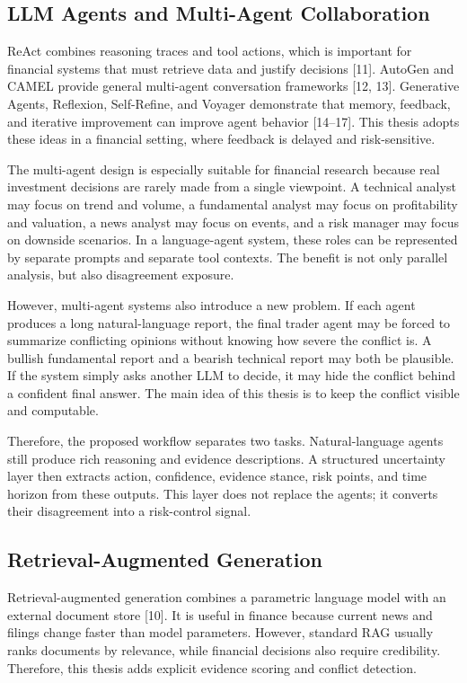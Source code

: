 \documentclass[14pt,a4paper]{extarticle}
\begin{document}
\subsection{LLM Agents and Multi-Agent Collaboration}

ReAct combines reasoning traces and tool actions, which is important for financial systems that must retrieve data and justify decisions [11]. AutoGen and CAMEL provide general multi-agent conversation frameworks [12, 13]. Generative Agents, Reflexion, Self-Refine, and Voyager demonstrate that memory, feedback, and iterative improvement can improve agent behavior [14--17]. This thesis adopts these ideas in a financial setting, where feedback is delayed and risk-sensitive.

The multi-agent design is especially suitable for financial research because real investment decisions are rarely made from a single viewpoint. A technical analyst may focus on trend and volume, a fundamental analyst may focus on profitability and valuation, a news analyst may focus on events, and a risk manager may focus on downside scenarios. In a language-agent system, these roles can be represented by separate prompts and separate tool contexts. The benefit is not only parallel analysis, but also disagreement exposure.

However, multi-agent systems also introduce a new problem. If each agent produces a long natural-language report, the final trader agent may be forced to summarize conflicting opinions without knowing how severe the conflict is. A bullish fundamental report and a bearish technical report may both be plausible. If the system simply asks another LLM to decide, it may hide the conflict behind a confident final answer. The main idea of this thesis is to keep the conflict visible and computable.

Therefore, the proposed workflow separates two tasks. Natural-language agents still produce rich reasoning and evidence descriptions. A structured uncertainty layer then extracts action, confidence, evidence stance, risk points, and time horizon from these outputs. This layer does not replace the agents; it converts their disagreement into a risk-control signal.

\subsection{Retrieval-Augmented Generation}

Retrieval-augmented generation combines a parametric language model with an external document store [10]. It is useful in finance because current news and filings change faster than model parameters. However, standard RAG usually ranks documents by relevance, while financial decisions also require credibility. Therefore, this thesis adds explicit evidence scoring and conflict detection.
\end{document}
